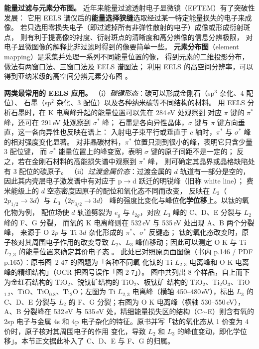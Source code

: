 \begin{principle}
\textbf{能量过滤与元素分布图。} 近年来能量过滤透射电子显微镜（EFTEM）有了突破性发展：
它用 EELS 谱仪后的\textbf{能量选择狭缝}选取经过某一特定能量损失的电子来成像。
若只选用零损失电子（即过滤掉所有非弹性散射的电子）成像或形成衍射斑点，
则有利于提高像的衬度、衍射斑点的清晰度和高分辨像的信息分辨极限，
对电子显微图像的解释比非过滤时得到的像要简单一些。
\textbf{元素分布图}（element mapping）是采集并处理一系列不同能量位置的像，
得到元素的二维投影分布，做法有两窗口法、三窗口法及 EELS 谱图法；
利用 EELS 的高空间分辨率，可以得到亚纳米级的高空间分辨元素分布图
。

\textbf{两类最常用的 EELS 应用。}
（i）\emph{碳键形态}：碳可以形成金刚石（sp$^{3}$ 杂化、4 配位）、
石墨（sp$^{2}$ 杂化、3 配位）以及各种纳米碳等不同结构的材料。
用 EELS 分析石墨时，在 K 电离峰升起的能量位置可以先在 284\,eV 处观察到
对应 $\pi$ 键的 $\pi^{*}$ 峰，还可在 291\,eV 处观察到 $\sigma^{*}$ 峰；
石墨是各向异性晶体，$\sigma$ 键与 $\pi$ 键方向垂直，这一各向异性也反映在谱上：
入射电子束平行或垂直于 $c$ 轴时，$\pi^{*}$ 与 $\sigma^{*}$ 峰的相对强度变化显著。
对非晶碳材料，$\pi^{*}$ 位置只测到很小的峰，表明它只含少量 3 配位键，
而 $\sigma^{*}$ 能量位置上的峰变宽，表明 $\sigma$ 键的原子间距不是一定的；
反之，若在金刚石材料的高能损失谱中观察到 $\pi^{*}$ 峰，
则可确定其晶界或晶格缺陷处有 3 配位的碳原子。
（ii）\emph{过渡金属价态}：过渡金属的 $d$ 轨道有一部分是空的，
因此其内壳层电子激发谱中有对应于 p$\rightarrow$d 跃迁的明锐峰（旧称 white line）；
费米能级上的 $d$ 空态密度因原子的配位和氧化态不同而改变，
反映在 $L_2$（$2p_{1/2}\rightarrow3d$）与 $L_3$（$2p_{3/2}\rightarrow3d$）
峰的强度比变化与峰位\textbf{化学位移}上。以钛的氧化物为例，
配位场使 $d$ 轨道劈裂为 $e_g$ 与 $t_{2g}$，对应 $L_3$ 峰的 C、D、E 分裂与
$L_2$ 峰的 F、G 分裂，
而氧的 K 电离峰则在 532\,eV 与 535\,eV 处出现 A、B 两个分裂峰，
来源于 O $2p$ 与 Ti $3d$ 杂化形成的 $\pi^{*}$、$\sigma^{*}$ 反键态；
钛的氧化态改变时，原子核对其周围电子作用的改变导致 $L_2$、$L_3$
峰值移动；因此可以测定 O K 与 Ti $L_{2,3}$ 的能量位置来确定其价电子态
。
此处已对照原页面图像（书内 p.146 / PDF p.165）：原书图~2-47 的图题为「各种不同氧
化钛的 Ti $L_{2,3}$ 电离峰和 O K 电离峰的精细结构」（OCR 把图号误作「图 2-7」）。
图中共列出 8 个样品，自上而下为金红石结构的 TiO$_2$、锐钛矿结构的 TiO$_2$、板钛矿
结构的 TiO$_2$、Ti$_2$O$_3$、TiO$_{1.2}$、TiO、TiO$_{0.8}$、Ti$_2$O；左图为
Ti $L_{2,3}$ 电离峰（横轴 450--480\,eV），标出 $L_3$ 的 C、D、E 分裂与 $L_2$ 的
F、G 分裂；右图为 O K 电离峰（横轴 530--550\,eV），A、B 分裂峰在 532\,eV 与
535\,eV 处，精细能量损失区的结构（C$\sim$E）则含有氧的 2sp 电子与金属 4s 和 4p
电子杂化的特征。原书并写「钛的氧化态从 1 价变为 4 价时，原子核对其周围电子的作用
变化，导致 $L_2$ 和 $L_3$ 的峰值变动，即化学位移」。本节正文据此补入了 C、D、E
与 F、G 的归属。
\end{principle}


